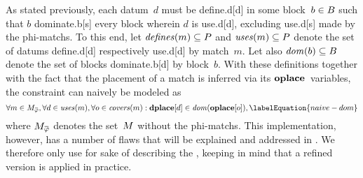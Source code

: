 As stated previously, each \gls{datum}~$d$ must be \gls{define.d}[d] in some
\gls{block}~\mbox{$b \in B$} such that $b$ \gls{dominate.b}[s] every
\gls{block} wherein $d$ is \gls{use.d}[d], excluding \gls{use.d}[s] made by the
\glspl{phi-match}.
%
To this end, let \mbox{$\mDefines(m) \subseteq \mOperandSet$} and
\mbox{$\mUses(m) \subseteq \mOperandSet$} denote the set of \glspl{datum}
\gls{define.d}[d] respectively \gls{use.d}[d] by \gls{match}~$m$.
%
Let also \mbox{$\operatorname{\textrm{\textit{dom}}}(b) \subseteq B$} denote the set of \glspl{block}
\gls{dominate.b}[d] by \gls{block}~$b$.
%
With these definitions together with the fact that the placement of a
\gls{match} is inferred via its $\mVar{oplace}$~\glspl{variable}, the
\gls{constraint} can naively be modeled as
%
\begin{equation}
  \forall m \in \mPhiMatchCompSet,
  \forall d \in \mUses(m),
  \forall o \in \mCovers(m) :
  \mVar{dplace}[d] \in \mDom(\mVar{oplace}[o]),
  \labelEquation{naive-dom}
\end{equation}
%
where $\mPhiMatchCompSet$ denotes the set~$\mMatchSet$ without the
\glspl{phi-match}.
%
This implementation, however, has a number of flaws that will be explained and
addressed in .
%
We therefore only use  for sake of describing the
, keeping in mind that a refined version is applied
in practice.

